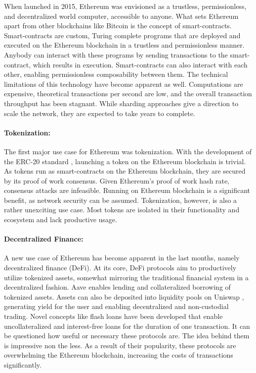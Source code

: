 \documentclass[../../thesis.tex]{subfiles}
\begin{document}
When launched in 2015, Ethereum \cite{wood2014ethereum} was envisioned as a trustless, permissionless, and decentralized world computer, accessible to anyone. What sets Ethereum apart from other blockchains like Bitcoin \cite{nakamoto2009bitcoin} is the concept of smart-contracts. Smart-contracts are custom, Turing complete programs that are deployed and executed on the Ethereum blockchain in a trustless and permissionless manner. Anybody can interact with these programs by sending transactions to the smart-contract, which results in execution. Smart-contracts can also interact with each other, enabling permissionless composability between them. The technical limitations of this technology have become apparent as well. Computations are expensive, theoretical transactions per second are low, and the overall transaction throughput has been stagnant. While sharding approaches give a direction to scale the network, they are expected to take years to complete. 

\paragraph{Tokenization:}
The first major use case for Ethereum was tokenization. With the development of the ERC-20 standard \cite{erc20}, launching a token on the Ethereum blockchain is trivial. As tokens run as smart-contracts on the Ethereum blockchain, they are secured by its proof of work consensus. Given Ethereum's proof of work hash rate, consensus attacks are infeasible. Running on Ethereum blockchain is a significant benefit, as network security can be assumed. Tokenization, however, is also a rather unexciting use case. Most tokens are isolated in their functionality and ecosystem and lack productive usage. 

\paragraph{Decentralized Finance:}
A new use case of Ethereum has become apparent in the last months, namely decentralized finance (DeFi). At its core, DeFi protocols aim to productively utilize tokenized assets, somewhat mirroring the traditional financial system in a decentralized fashion. Aave \cite{kulechov_2020} enables lending and collateralized borrowing of tokenized assets. Assets can also be deposited into liquidity pools on Uniswap \cite{adams2020uniswap}, generating yield for the user and enabling decentralized and non-custodial trading. Novel concepts like flash loans have been developed that enable uncollateralized and interest-free loans for the duration of one transaction. It can be questioned how useful or necessary these protocols are. The idea behind them is impressive non the less. As a result of their popularity, these protocols are overwhelming the Ethereum blockchain, increasing the costs of transactions significantly. 
\end{document}
